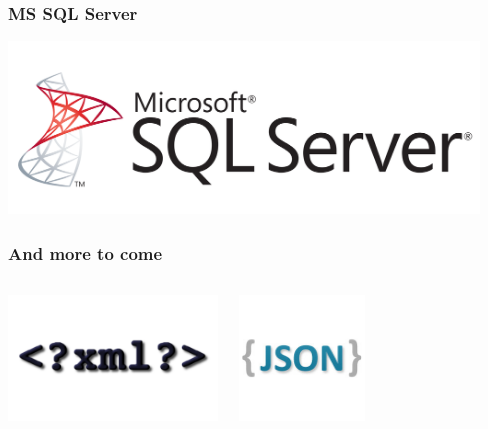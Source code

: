 \documentclass{beamer}
\begin{document}
\begin{frame}
  \frametitle{MS SQL Server}


  \begin{center}
    \includegraphics[height=1.8in]{mssql.png}
  \end{center}
\end{frame}

\begin{frame}
  \frametitle{And more to come}

  
  \begin{columns}[c]
    \begin{center}
      \includegraphics[height=9em]{xml.png}
    \end{center}
    \begin{center}
      \includegraphics[height=9em]{logo-json.png}
    \end{center}
  \end{columns}
\end{frame}
\end{document}
